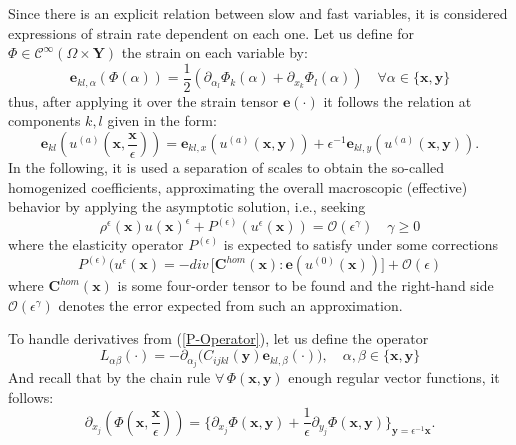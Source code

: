 Since there is an explicit relation between slow and fast variables, it is considered expressions of strain rate dependent on each one. Let us define for $\Phi \in \mathcal{C}^{\infty}(\Omega \times \mathbf{Y})$ the strain on each variable by:
\begin{equation*}
    \mathbf{e}_{kl,\alpha} (\Phi(\alpha)) = \frac{1}{2}(\partial_{\alpha_l} \Phi_k (\alpha) + \partial_{x_k} \Phi_l (\alpha)) \quad \forall \alpha \in \{\mathbf{x}, \mathbf{y}\}
\end{equation*}
thus, after applying it over the strain tensor $\mathbf{e}(\cdot)$ it follows the relation at components $k,l$ given in the form:
\begin{equation}
    \label{Multiscale-Strain}
    \mathbf{e}_{kl} ( u^{(a)}(\mathbf{x}, \frac{\mathbf{x}}{\epsilon})) = \mathbf{e}_{kl,x}( u^{(a)} (\mathbf{x},\mathbf{y})) + \epsilon^{-1} \mathbf{e}_{kl,y} (u^{(a)}(\mathbf{x},\mathbf{y})).
\end{equation}
In the following, it is used a separation of scales to obtain the so-called homogenized coefficients, approximating the overall macroscopic (effective) behavior by applying the asymptotic solution, i.e., seeking
\begin{equation*}
    \rho^{\epsilon}(\mathbf{x}) u(\mathbf{x})^{\epsilon} + P^{(\epsilon)}(u^{\epsilon}(\mathbf{x})) = \mathcal{O}(\epsilon^{\gamma}) \quad \gamma \geq 0
\end{equation*}
where the elasticity operator $P^{(\epsilon)}$ is expected to satisfy under some corrections
\begin{equation}
    \label{P-Operator}
    P^{(\epsilon)}(u^{\epsilon}(\mathbf{x}) = - div \, \big[\mathbf{C}^{hom}(\mathbf{x}): \mathbf{e}(u^{(0)}(\mathbf{x}))\big] + \mathcal{O}(\epsilon)
\end{equation}
where $\mathbf{C}^{hom}(\mathbf{x})$ is some four-order tensor to be found and the right-hand side $\mathcal{O}(\epsilon^{\gamma})$ denotes the error expected from such an approximation. 

To handle derivatives from (\ref{P-Operator}), let us define the operator 
\begin{equation*}
    L_{\alpha \beta} (\cdot) = - \partial_{\alpha_j} \big( C_{ijkl} (\mathbf{y}) \mathbf{e}_{kl, \beta}(\cdot) \big), \quad \alpha, \beta \in \{ \mathbf{x},\mathbf{y} \}
\end{equation*}
And recall that by the chain rule $\forall \, \Phi(\mathbf{x},\mathbf{y})$ enough regular vector functions, it follows:
\begin{equation*}
    \partial_{x_j} (\Phi (\mathbf{x}, \frac{\mathbf{x}}{\epsilon})) = \big \{ \partial_{x_j} \Phi (\mathbf{x}, \mathbf{y}) + \frac{1}{\epsilon} \partial_{y_j} \Phi(\mathbf{x},\mathbf{y}) \big \}_{\mathbf{y}= \epsilon^{-1}\mathbf{x}}.
\end{equation*}

